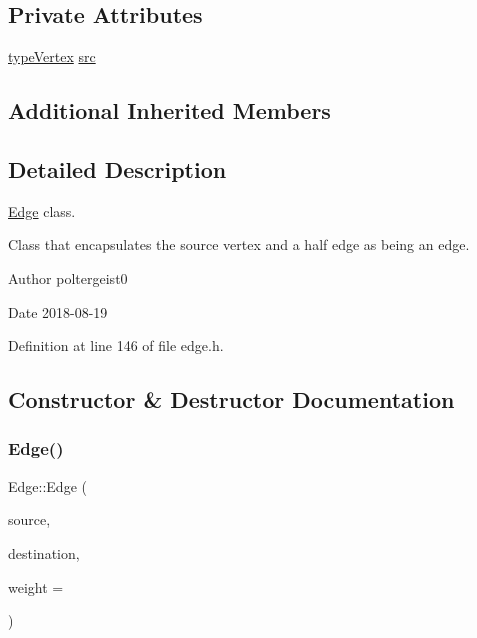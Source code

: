 \subsection*{Private Attributes}
\begin{DoxyCompactItemize}
\item 
\hyperlink{edge_8h_a5fbd20c46956d479cb10afc9855223f6}{type\+Vertex} \hyperlink{classEdge_ac5a2d838052e08bc14c4741465f690e6}{src}
\end{DoxyCompactItemize}
\subsection*{Additional Inherited Members}


\subsection{Detailed Description}
\hyperlink{classEdge}{Edge} class. 

Class that encapsulates the source vertex and a half edge as being an edge.

\begin{DoxyAuthor}{Author}
poltergeist0
\end{DoxyAuthor}
\begin{DoxyDate}{Date}
2018-\/08-\/19 
\end{DoxyDate}


Definition at line 146 of file edge.\+h.



\subsection{Constructor \& Destructor Documentation}
\mbox{\label{classEdge_a2fabe9d380a34f8127308d4f578872fd}} 
\subsubsection{\texorpdfstring{Edge()}{Edge()}}
{\footnotesize\ttfamily Edge\+::\+Edge (\begin{DoxyParamCaption}\item[{const \hyperlink{edge_8h_a5fbd20c46956d479cb10afc9855223f6}{type\+Vertex} \&}]{source,  }\item[{const \hyperlink{edge_8h_a5fbd20c46956d479cb10afc9855223f6}{type\+Vertex} \&}]{destination,  }\item[{const \hyperlink{edge_8h_a2e7ea3be891ac8b52f749ec73fee6dd2}{type\+Weight} \&}]{weight = {} }\end{DoxyParamCaption})\hspace{0.3cm}{\ttfamily [inline]}}

